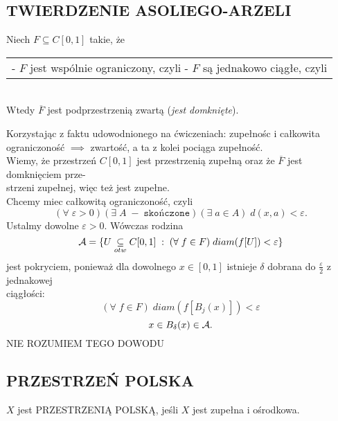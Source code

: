 \subsection{TWIERDZENIE ASOLIEGO-ARZELI}
\begin{center}\large
    Niech $F\subseteq C[0, 1]$ takie, że\smallskip\\
    \begin{tabular} { c }
        \makecell [l] {
            - $F$ jest wspólnie ograniczony, czyli\smallskip\\
            \indent{\normalsize$(\exists\;c>0) (\forall\;f\in F)(\forall\;x\in [0, 1])|f(x)|<c$}\smallskip\\
            - $F$ są jednakowo ciągłe, czyli\smallskip\\
            \indent{\normalsize$(\forall\;x)(\forall\;\varepsilon>0)(\exists\;\delta>0)(\forall\;f\in F)\;|x-y|<\delta\implies |f(x)-f(y)|<\varepsilon$} }
    \end{tabular}\medskip\\
    Wtedy $\overline F$ jest podprzestrzenią zwartą (\emph{jest domknięte}).
\end{center}
\dowod
Korzystając z faktu udowodnionego na ćwiczeniach: zupełnośc i całkowita ograniczoność $\implies$ zwartość, a ta z kolei pociąga zupełność.\bigskip\\
Wiemy, że przestrzeń $C[0, 1]$ jest przestrzenią zupełną oraz że $\overline F$ jest domknięciem prze-\\strzeni zupełnej, więc też jest zupełne.\smallskip\\
Chcemy miec całkowitą ograniczoność, czyli
$$(\forall\;\varepsilon>0)(\exists\;A\;-\;\texttt{skończone})(\exists\;a\in A)\;d(x, a)<\varepsilon.$$
Ustalmy dowolne $\varepsilon>0$. Wówczas rodzina
$$\mathcal{A}=\{U\underset{otw}\subseteq C[0, 1]\;:\;(\forall\;f\in F)\;diam( f[U])<\varepsilon\}$$
jest pokryciem, ponieważ dla dowolnego $x\in [0, 1]$ istnieje $\delta$ dobrana do $\frac\varepsilon2$ z jednakowej \\ciągłości:
$$(\forall\;f\in F)\;diam(f[B_j(x)])<\varepsilon$$
$$x\in B_\delta(x)\in \mathcal{A}.$$
{\color{cyan}NIE ROZUMIEM TEGO DOWODU}

\subsection{PRZESTRZEŃ POLSKA}
\begin{center}\large
    $X$ jest {\color{def}PRZESTRZENIĄ POLSKĄ}, jeśli $X$ jest {\color{acc}zupełna} i {\color{acc}ośrodkowa}.
\end{center}